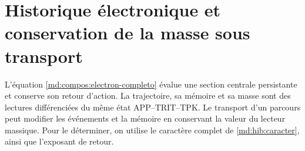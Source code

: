 \section{Historique électronique et conservation de la masse sous transport}
\label{md:r27:electron}

L'équation \eqref{md:compos:electron-completo} évalue une section centrale persistante et conserve son retour d'action. La trajectoire, sa mémoire et sa masse sont des lectures différenciées du même état APP--TRIT--TPK. Le transport d'un parcours peut modifier les événements et la mémoire en conservant la valeur du lecteur massique. Pour le déterminer, on utilise le caractère complet de \eqref{md:hib:caracter}, ainsi que l'exposant de retour.

